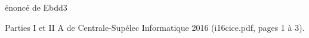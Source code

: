 énoncé de Ebdd3

Parties I et II A de Centrale-Supélec Informatique 2016 (i16cice.pdf, pages 1 à 3).